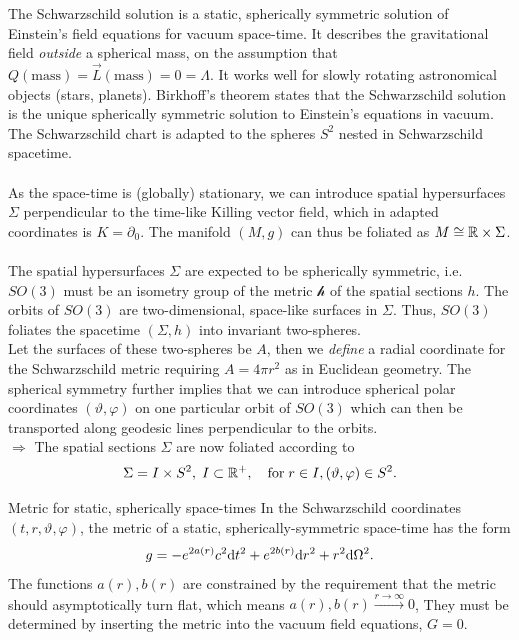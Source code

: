  The Schwarzschild solution is a static, spherically symmetric solution of Einstein's field equations for vacuum space-time. It describes the gravitational field \emph{outside} a spherical mass, on the assumption that $Q(\mathrm{mass})=\vec{L}(\mathrm{mass})=0=\Lambda$. It works well for slowly rotating astronomical objects (stars, planets). Birkhoff’s theorem states that the
 Schwarzschild solution is the unique spherically symmetric solution to Einstein’s equations
 in vacuum.\\ The Schwarzschild chart is adapted to the spheres $S^2$ nested in Schwarzschild spacetime.\\
 \\
 As the space-time is (globally) stationary, we can introduce spatial hypersurfaces $\Sigma$ perpendicular to the time-like Killing vector field, which in adapted coordinates is $K=\partial_0$. The manifold $(M,g)$ can thus be foliated as $M \cong \mathbb{R} \times \Sigma$.\\
 \\
 The spatial hypersurfaces $ \Sigma$ are expected to be spherically symmetric, i.e. $SO(3)$ must be an isometry group of the metric $\mathcal{h}$ of the spatial sections 
$h$. The orbits of $SO(3)$ are two-dimensional, space-like surfaces in $\Sigma$. Thus, $SO(3)$ foliates the spacetime $(\Sigma, h)$ into invariant two-spheres.\\
Let the surfaces of these two-spheres be $A$, then we \emph{define} a radial coordinate for the Schwarzschild metric requiring $A=4 \pi r^2$ as in Euclidean geometry. The spherical symmetry further implies that we can introduce spherical polar coordinates $(\vartheta,\varphi)$ on one particular orbit of $SO(3)$ which can then be transported along geodesic lines perpendicular to the orbits.\\
$\Rightarrow$ The spatial sections $\Sigma$ are now foliated according to 
\begin{equation}
	\Sigma = I \times S^2, \; I\subset \mathbb{R}^+, \quad \mathrm{for} \;r\in I, (\vartheta, \varphi) \in S^2.
\end{equation}
\begin{mybox}{Metric for static, spherically space-times}
	In the Schwarzschild coordinates $(t,r,\vartheta,\varphi)$, the metric of a static, spherically-symmetric space-time has the form
	\begin{equation}
		g = - e^{2 a(r)} c^2 \mathrm{d} t^2 + e^{2 b(r)} \mathrm{d} r^2 + r^2 \mathrm{d} \Omega^2.
	\end{equation}
	The functions $a(r), b(r)$ are constrained by the requirement that the metric should asymptotically turn flat, which means $a(r),b(r) \stackrel{r \rightarrow \infty}{\longrightarrow} 0$, They must be determined by inserting the metric into the vacuum field equations, $G=0$.
\end{mybox}
